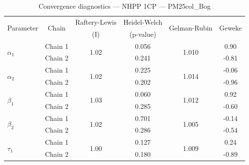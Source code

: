 \begin{table}[H]
\centering
\caption{Convergence diagnostics — NHPP 1CP — PM25col_Bog}
\begin{tabular}{lccccc}
\toprule
\multirow{2}{*}{Parameter} & \multirow{2}{*}{Chain} & Raftery-Lewis & Heidel-Welch & \multirow{2}{*}{Gelman-Rubin} & \multirow{2}{*}{Geweke} \\
 & & (I) & (p-value) & & (z) \\
\midrule
\multirow{2}{*}{$\alpha_1$} & Chain 1 & \multirow{2}{*}{1.02} & 0.056 & \multirow{2}{*}{1.010} & 0.90 \\
 & Chain 2 & & 0.241 & & -0.81 \\
\multirow{2}{*}{$\alpha_2$} & Chain 1 & \multirow{2}{*}{1.02} & 0.225 & \multirow{2}{*}{1.014} & -0.06 \\
 & Chain 2 & & 0.202 & & -0.96 \\
\midrule
\multirow{2}{*}{$\beta_1$} & Chain 1 & \multirow{2}{*}{1.03} & 0.060 & \multirow{2}{*}{1.012} & 0.92 \\
 & Chain 2 & & 0.285 & & -0.60 \\
\multirow{2}{*}{$\beta_2$} & Chain 1 & \multirow{2}{*}{1.02} & 0.701 & \multirow{2}{*}{1.005} & -0.14 \\
 & Chain 2 & & 0.286 & & -0.54 \\
\midrule
\multirow{2}{*}{$\tau_1$} & Chain 1 & \multirow{2}{*}{1.00} & 0.127 & \multirow{2}{*}{1.009} & 0.24 \\
 & Chain 2 & & 0.180 & & -0.89 \\
\bottomrule
\end{tabular}
\end{table}
